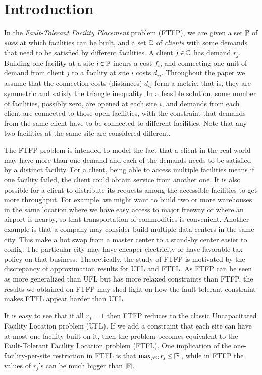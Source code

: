 \section{Introduction}

In the \emph{Fault-Tolerant Facility Placement} problem
(FTFP), we are given a set $\mathbb{F}$ of \emph{sites} at
which facilities can be built, and a set $\mathbb{C}$ of
\emph{clients} with some demands that need to be satisfied
by different facilities. A client $j\in\mathbb{C}$ has
demand $r_j$. Building one facility at a site
$i\in\mathbb{F}$ incurs a cost $f_i$, and connecting one unit
of demand from client $j$ to a facility at site $i$ costs
$d_{ij}$. Throughout the paper we assume that the connection
costs (distances) $d_{ij}$ form a metric, that is, they are
symmetric and satisfy the triangle inequality. In a feasible
solution, some number of facilities, possibly zero, are
opened at each site $i$, and demands from each client are
connected to those open facilities, with the constraint that
demands from the same client have to be connected to
different facilities. Note that any two facilities at the
same site are considered different.

The FTFP problem is intended to model the fact that a client
in the real world may have more than one demand and each of
the demands needs to be satisfied by a distinct
facility. For a client, being able to access multiple
facilities means if one facility failed, the client could
obtain service from another one. It is also possible for a
client to distribute its requests among the accessible
facilities to get more throughput. For example, we might
want to build two or more warehouses in the same location
where we have easy access to major freeway or where an
airport is nearby, so that transportation of commodities is
convenient. Another example is that a company may consider
build multiple data centers in the same city. This make a
hot swap from a master center to a stand-by center easier to
config. The particular city may have cheaper electricity or
have favorable tax policy on that business. Theoretically,
the study of FTFP is motivated by the discrepancy of
approximation results for UFL and FTFL. As FTFP can be seen
as more generalized than UFL but has more relaxed
constraints than FTFP, the results we obtained on FTFP may
shed light on how the fault-tolerant constraint makes FTFL
appear harder than UFL.

It is easy to see that if all $r_j=1$ then FTFP reduces to
the classic Uncapacitated Facility Location problem (UFL).
If we add a constraint that each site can have at most one
facility built on it, then the problem becomes equivalent to the
Fault-Tolerant Facility Location problem (FTFL). One
implication of the one-facility-per-site restriction in FTFL
is that $\max_{j\in\mathbb{C}}r_j \leq |\mathbb{F}|$, while
in FTFP the values of $r_j$'s can be much bigger than
$|\mathbb{F}|$.

